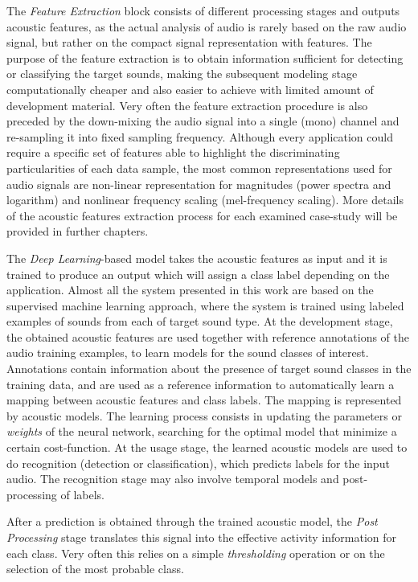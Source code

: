 The \textit{Feature Extraction} block consists
of different processing stages and outputs acoustic features, as the actual analysis of
audio is rarely based on the raw audio signal, but rather on the compact signal
representation with features. The purpose of the feature extraction is to obtain
information sufficient for detecting or classifying the target sounds, making the
subsequent modeling stage computationally cheaper and also easier to achieve with
limited amount of development material. Very often the feature extraction procedure is also preceded by the down-mixing the audio signal into a single (mono) channel and re-sampling it into fixed sampling frequency.
Although every application could require a specific set of features able to highlight the discriminating particularities of each data sample, the most common representations used
for audio signals are non-linear representation for magnitudes (power spectra and logarithm) and nonlinear frequency scaling (mel-frequency scaling). 
More details of the acoustic features extraction process for each examined case-study will be provided in further chapters.


The \textit{Deep Learning}-based model takes the acoustic features as input and it is trained to produce an output which will assign a class label depending on the application. Almost all the system presented in this work are based on the supervised machine learning approach, where the system is trained using labeled examples of sounds from each of target sound type. 
At the development stage, the obtained acoustic features are used together with
reference annotations of the audio training examples, to learn models for the
sound classes of interest. Annotations contain information about the presence of
target sound classes in the training data, and are used as a reference information
to automatically learn a mapping between acoustic features and class labels. The
mapping is represented by acoustic models. The learning process consists in updating the parameters or \textit{weights} of the neural network, searching for the optimal model that minimize a certain cost-function. 
At the usage stage, the learned acoustic models are used to do recognition (detection or classification), which predicts labels
for the input audio. The recognition stage may also involve temporal models and
post-processing of labels.


After a prediction is obtained through the trained acoustic model, the \textit{Post Processing} stage translates this signal into the effective activity information for each class. Very often this relies on a simple \textit{thresholding} operation or on the selection of the most probable class.



